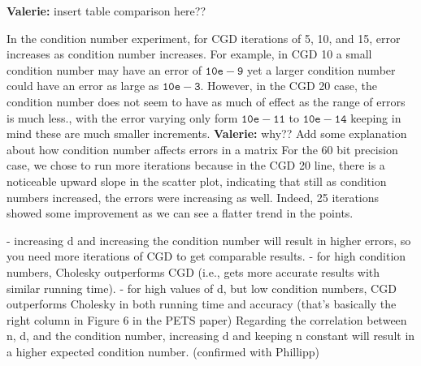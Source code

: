 \documentclass{article}
\theoremstyle{plain}
\theoremstyle{definition}
\theoremstyle{remark}
\newcommand{\vc}[1]{{\textcolor{lred}{\textbf{Valerie:} #1}}}
\begin{document}
\vc{insert table comparison here??}

In the condition number experiment, for CGD iterations of 5, 10, and 15, error increases as condition number increases. For example, in CGD 10 a small condition number may have an error of $\mathtt{10e-9}$ yet a larger condition number could have an error as large as $\mathtt{10e-3}$. However, in the CGD 20 case, the condition number does not seem to have as much of effect as the range of errors is much less., with the error varying only form $\mathtt{10e-11}$ to $\mathtt{10e-14}$ keeping in mind these are much smaller increments. \vc{why?? Add some explanation about how condition number affects errors in a matrix} For the 60 bit precision case, we chose to run more iterations because in the CGD 20 line, there is a noticeable upward slope in the scatter plot, indicating that still as condition numbers increased, the errors were increasing as well. Indeed, 25 iterations showed some improvement as we can see a flatter trend in the points.

- increasing d and increasing the condition number will result in higher errors, so you need more iterations of CGD to get comparable results.
- for high condition numbers, Cholesky outperforms CGD (i.e., gets more accurate results with similar running time).
- for high values of d, but low condition numbers, CGD outperforms Cholesky in both running time and accuracy (that's basically the right column in Figure 6 in the PETS paper)
Regarding the correlation between n, d, and the condition number, increasing d and keeping n constant will result in a higher expected condition number.
(confirmed with Phillipp)
\end{document}
